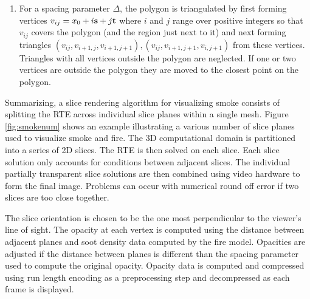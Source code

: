{\begin{enumerate}
\begin{eqnarray*}
    a_i&=&(p_i-x_0) \cdot \vvec{s}\\
    b_i&=&(p_i-x_0) \cdot \vvec{t}
\end{eqnarray*}

where $x_0$ is translated from $p_0$ in the polygonal plane so that all $a_i$ and $b_i$ are positive. If $\vvec{s}$ and $\vvec{t}$ are thought of as two axese, then the coordinates $a_i$ and $b_i$ may be interpreted as the distance from $\vvec{s}$ and $\vvec{t}$ respectively.

\item For a spacing parameter $\Delta$, the polygon is triangulated by first
forming vertices $v_{ij}=x_0 + i\mathbf{s} + j \mathbf{t}$ where $i$ and $j$ range over positive integers 
so that $v_{ij}$ covers the polygon (and the region just next to it)
and next forming triangles $(v_{ij},v_{i+1,j},v_{i+1,j+1}), (v_{ij},v_{i+1,j+1},v_{i,j+1}) $ from these vertices.
Triangles with all vertices outside the polygon are neglected.
If one or two vertices are outside the polygon they are moved to the closest point on the polygon.

\end{enumerate}

Summarizing, a slice rendering algorithm for visualizing smoke consists of
splitting the RTE across individual slice planes within a single
mesh.  Figure \ref{fig:smokenum} shows an example illustrating a various number
of slice planes used to visualize smoke and fire.
The 3D computational domain is partitioned into a series of
2D slices.  The RTE is then solved on each slice.  Each slice
solution only accounts for conditions between adjacent slices.
The individual partially transparent slice solutions are then
combined using video hardware to form the final image.   Problems
can occur with numerical round off error if two slices are too
close together.

The slice orientation
is chosen to be the one most perpendicular to the viewer's line of
sight.  The opacity at each vertex is computed using the
distance between adjacent planes and soot density
data computed by the fire model.  Opacities are adjusted if the distance
between planes is different than the spacing parameter used to compute the original opacity.  Opacity data is
computed and compressed using run length encoding as a
preprocessing step and decompressed as each frame is
displayed.

}
